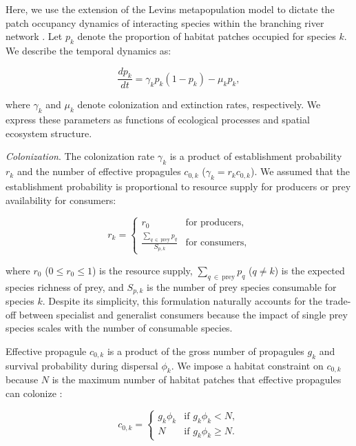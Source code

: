 \documentclass[11pt, class=article, crop=false]{standalone}
\begin{document}
Here, we use the extension of the Levins metapopulation model to dictate the patch occupancy dynamics of interacting species within the branching river network \citep{calcagno_constraints_2011, takimoto_effects_2012, guo_towards_2023}.
Let $p_k$ denote the proportion of habitat patches occupied for species $k$.
We describe the temporal dynamics as:

\begin{equation}
    \frac{dp_k}{dt} = \gamma_{k} p_k (1 - p_k) - \mu_k p_k,
\end{equation}

where $\gamma_k$ and $\mu_k$ denote colonization and extinction rates, respectively.
We express these parameters as functions of ecological processes and spatial ecosystem structure.

\textit{Colonization}. The colonization rate $\gamma_k$ is a product of establishment probability $r_k$ and the number of effective propagules $c_{0,k}$ ($\gamma_k = r_k c_{0,k}$).
We assumed that the establishment probability is proportional to resource supply for producers or prey availability for consumers:

\begin{equation}
    r_{k} = 
    \begin{cases}
        r_0 & \text{for producers,}\\
        \frac{\sum_{q~\in~\text{prey}} p_{q}}{S_{p,k}} & \text{for consumers,}
    \end{cases}
\end{equation}

where $r_0$ ($0 \le r_0 \le 1$) is the resource supply, $\sum_{q~\in~\text{prey}} p_{q}$ ($q \ne k$) is the expected species richness of prey, and $S_{p,k}$ is the number of prey species consumable for species $k$.
Despite its simplicity, this formulation naturally accounts for the trade-off between specialist and generalist consumers because the impact of single prey species scales with the number of consumable species.

Effective propagule $c_{0,k}$ is a product of the gross number of propagules $g_k$ and survival probability during dispersal $\phi_k$.
We impose a habitat constraint on $c_{0,k}$ because $N$ is the maximum number of habitat patches that effective propagules can colonize \citep{takimoto_effects_2012, terui_spatial_2019}:

\begin{equation}
    c_{0, k} = 
    \begin{cases}
        g_k \phi_k & \text{if $g_k \phi_k < N$},\\
        N & \text{if $g_k \phi_k \ge N$}.
    \end{cases}
    \label{eq:c0-prod}
\end{equation}
\end{document}
